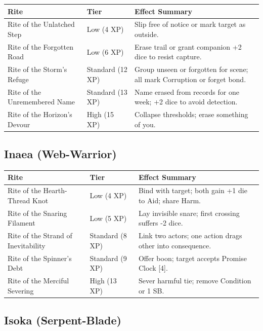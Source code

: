 \begin{longtable}{p{} p{} p{}}
\hline
\textbf{Rite} & \textbf{Tier} & \textbf{Effect Summary} \\
\hline
Rite of the Unlatched Step & Low (4 XP) & Slip free of notice or mark target as outside. \\
Rite of the Forgotten Road & Low (6 XP) & Erase trail or grant companion +2 dice to resist capture. \\
Rite of the Storm's Refuge & Standard (12 XP) & Group unseen or forgotten for scene; all mark Corruption or forget bond. \\
Rite of the Unremembered Name & Standard (13 XP) & Name erased from records for one week; +2 dice to avoid detection. \\
Rite of the Horizon's Devour & High (15 XP) & Collapse thresholds; erase something of you. \\
\hline
\end{longtable}

\subsection{Inaea (Web-Warrior)}

\begin{longtable}{p{} p{} p{}}
\hline
\textbf{Rite} & \textbf{Tier} & \textbf{Effect Summary} \\
\hline
Rite of the Hearth-Thread Knot & Low (4 XP) & Bind with target; both gain +1 die to Aid; share Harm. \\
Rite of the Snaring Filament & Low (5 XP) & Lay invisible snare; first crossing suffers -2 dice. \\
Rite of the Strand of Inevitability & Standard (8 XP) & Link two actors; one action drags other into consequence. \\
Rite of the Spinner's Debt & Standard (9 XP) & Offer boon; target accepts Promise Clock [4]. \\
Rite of the Merciful Severing & High (13 XP) & Sever harmful tie; remove Condition or 1 SB. \\
\hline
\end{longtable}

\subsection{Isoka (Serpent-Blade)}

